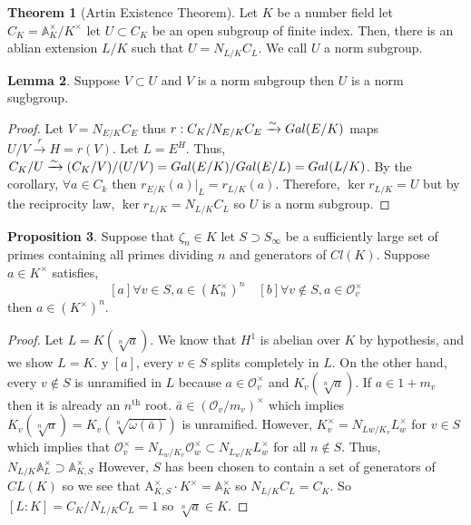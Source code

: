 \documentclass[12pt]{extarticle}
\newcommand{\galgroup}[1]{Gal \small(#1 \small)}
\theoremstyle{definition}
\newtheorem{theorem}{Theorem}[section]
\newtheorem{lemma}[theorem]{Lemma}
\newtheorem{proposition}[theorem]{Proposition}
\begin{document}
\begin{theorem}[Artin Existence Theorem]
Let $K$ be a number field let $C_K = \mathbb{A}^\times_K / K^\times$ let $U \subset C_K$ be an open subgroup of finite index. Then, there is an ablian extension $L/K$ such that $U = N_{L/K} C_L$. We call $U$ a norm subgroup. 
\end{theorem}

\begin{lemma}
Suppose $V \subset U$ and $V$ is a norm subgroup then $U$ is a norm sugbgroup.
\end{lemma}

\begin{proof}
Let $V = N_{E/K} C_E$  thus $r : C_K / N_{E/K} C_E  \xrightarrow{\sim} \galgroup{E/K}$ maps $U/V \xrightarrow{r} H = r(V)$.  Let $L = E^H$. Thus, $C_K / U \xrightarrow{\sim} (C_K/V)/(U/V) = \galgroup{E/K} / \galgroup{E/L} = \galgroup{L/K}$. By the corollary, $\forall a \in C_k$ then $r_{E/K}(a) |_L = r_{L/K}(a)$. Therefore, $\ker{r_{L/K}} = U$ but by the reciprocity law, $\ker{r_{L/K}} = N_{L/K} C_L$ so $U$ is a norm subgroup. 
\end{proof}

\begin{proposition}
Suppose that $\zeta_n \in K$ let $S \supset S_{\infty}$ be a sufficiently large set of primes containing all primes dividing $n$ and generators of $Cl(K)$. Suppose $a \in K^\times$ satisfies, 
\[ [a] \forall v \in S, a \in (K_n^\times)^n \quad [b] \forall v \notin S, a \in \mathcal{O}_v^\times \]
then $a \in (K^\times)^n$. 
\end{proposition}

\begin{proof}
Let $L = K(\sqrt[n]{a})$. We know that $H^1$ is abelian over $K$ by  hypothesis, and we show $L = K$. y $[a]$, every $v \in S$ splits completely in $L$. On the other hand, every $v \notin S$ is unramified in $L$ because $a \in \mathcal{O}_v^\times$ and $K_v(\sqrt[n]{a})$. If $a \in 1 + m_v$ then it is already an $n^{\text{th}}$ root. $\bar{a} \in ( \mathcal{O}_v / m_v )^\times$ which implies $K_v(\sqrt[n]{a}) = K_v(\sqrt[n]{\omega(\bar{a})})$ is unramified. However, $K_v^\times = N_{Lw/K_v} L_w^\times$ for $v \in S$ which implies that $\mathcal{O}_v^\times = N_{L_w/K_v} \mathcal{O}_w^\times \subset N_{L_w/K} L_w^\times$ for all $n \notin S$. Thus, $N_{L/K} \mathbb{A}_L^\times \supset \mathbb{A}^\times_{K,S}$ However, $S$ has been chosen to contain a set of generators of $CL(K)$ so we see that $\mathrm{A}^\times_{K,S} \cdot K^\times = \mathbb{A}_K^\times$ so $N_{L/K} C_L = C_K$. So $[L : K] = C_K / N_{L/K} C_L = 1$ so $\sqrt[n]{a} \in K$.  
\end{proof}
\end{document}
